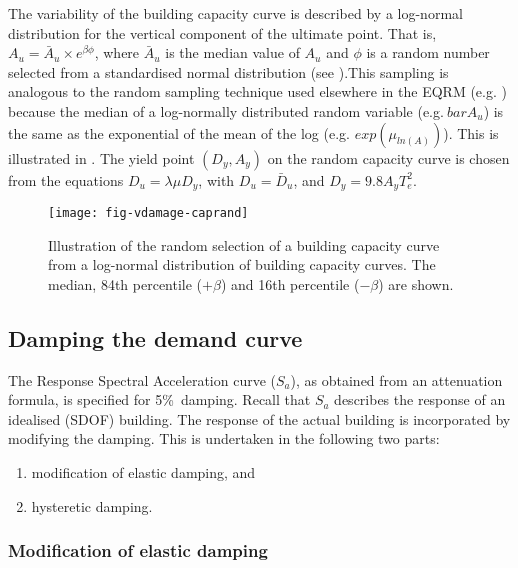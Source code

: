 The variability of the building capacity curve is described by a log-normal distribution for the vertical
component of the ultimate point. That is, $A_u=\bar A_u\times
e^{\beta\phi}$, where $\bar A_u$ is the median value of $A_u$ and
$\phi$ is a random number selected from a standardised normal
distribution (see ).This sampling is
analogous to the random sampling technique used elsewhere in the
EQRM (e.g. ) because the median
 of a log-normally distributed random variable (e.g.$\ bar A_u$) is the
 same as the exponential of the mean of the log (e.g. $exp(\mu_{ln(A)})$).
 This is illustrated in
. The yield point $(D_y, A_y)$
on the random capacity curve is chosen from
the equations $D_u=\lambda\mu D_y$, with $D_u=\bar D_u$, and $D_y
= 9.8A_yT_e^2$.

\begin{figure}[htp]
\centering
{}
\texttt{[image: fig-vdamage-caprand]}
\caption{Illustration of the random selection of a building
capacity curve from a log-normal
distribution of building capacity curves.
The median, 84th percentile ($+\beta$) and 16th percentile
($-\beta$) are shown.} \label{fig:vdamage-capcurve-random}
\end{figure}




\subsection{Damping the demand curve}
\label{subsec:v-dam-damping}

The Response Spectral Acceleration curve ($S_a$), as obtained from
an attenuation formula, is specified for 5\%\ damping. Recall that
$S_a$ describes the response of an idealised (SDOF) building. The
response of the actual building is incorporated by modifying the
damping. This is undertaken in the following two parts:
\begin{enumerate}
\item modification of elastic damping, and \item hysteretic
damping.
\end{enumerate}


\subsubsection{Modification of elastic damping}
\label{sec:damage-elasticdamping}


